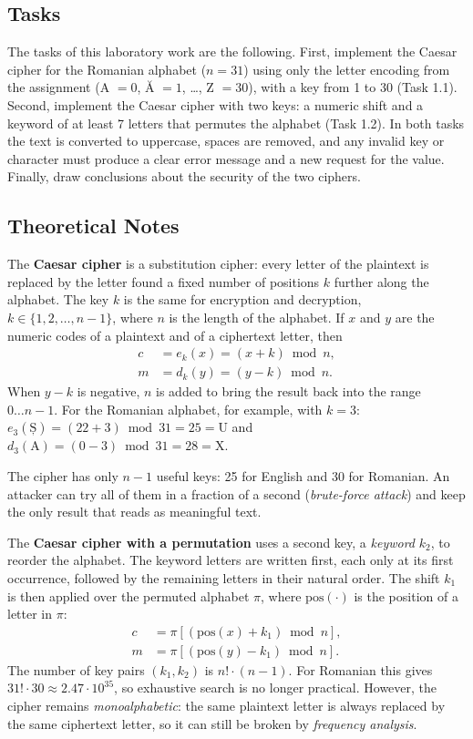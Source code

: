 \documentclass[12pt,a4paper]{article}
\begin{document}
\subsection{Tasks}

The tasks of this laboratory work are the following. First, implement the Caesar cipher
for the Romanian alphabet ($n = 31$) using only the letter encoding from the assignment
(A $=0$, Ă $=1$, \ldots, Z $=30$), with a key from 1 to 30 (Task 1.1). Second, implement
the Caesar cipher with two keys: a numeric shift and a keyword of at least 7 letters that
permutes the alphabet (Task 1.2). In both tasks the text is converted to uppercase, spaces
are removed, and any invalid key or character must produce a clear error message and a
new request for the value. Finally, draw conclusions about the security of the two ciphers.

\subsection{Theoretical Notes}

The \textbf{Caesar cipher} is a substitution cipher: every letter of the plaintext is
replaced by the letter found a fixed number of positions $k$ further along the alphabet.
The key $k$ is the same for encryption and decryption, $k \in \{1, 2, \ldots, n-1\}$,
where $n$ is the length of the alphabet. If $x$ and $y$ are the numeric codes of a
plaintext and of a ciphertext letter, then
\begin{align*}
  c &= e_k(x) = (x + k) \bmod n, \\
  m &= d_k(y) = (y - k) \bmod n.
\end{align*}
When $y - k$ is negative, $n$ is added to bring the result back into the range
$0 \ldots n-1$. For the Romanian alphabet, for example, with $k = 3$:
$e_3(\text{Ș}) = (22 + 3) \bmod 31 = 25 = \text{U}$ and
$d_3(\text{A}) = (0 - 3) \bmod 31 = 28 = \text{X}$.

The cipher has only $n - 1$ useful keys: 25 for English and 30 for Romanian. An attacker
can try all of them in a fraction of a second (\textit{brute-force attack}) and keep the
only result that reads as meaningful text.

The \textbf{Caesar cipher with a permutation} uses a second key, a \textit{keyword} $k_2$,
to reorder the alphabet. The keyword letters are written first, each only at its first
occurrence, followed by the remaining letters in their natural order. The shift $k_1$ is then
applied over the permuted alphabet $\pi$, where $\mathrm{pos}(\cdot)$ is the position of a
letter in $\pi$:
\begin{align*}
  c &= \pi\left[(\mathrm{pos}(x) + k_1) \bmod n\right], \\
  m &= \pi\left[(\mathrm{pos}(y) - k_1) \bmod n\right].
\end{align*}
The number of key pairs $(k_1, k_2)$ is $n! \cdot (n-1)$. For Romanian this gives
$31! \cdot 30 \approx 2.47 \cdot 10^{35}$, so exhaustive search is no longer practical.
However, the cipher remains \textit{monoalphabetic}: the same plaintext letter is always
replaced by the same ciphertext letter, so it can still be broken by
\textit{frequency analysis}.
\end{document}
